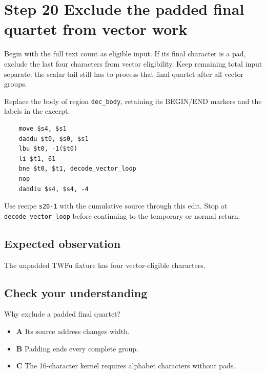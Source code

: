 \section{Step 20 Exclude the padded final quartet from vector work}\label{base64-s20}

Begin with the full text count as eligible input. If its final character is a pad, exclude the last four characters from vector eligibility. Keep remaining total input separate: the scalar tail still has to process that final quartet after all vector groups.

Replace the body of region \texttt{dec\_body}, retaining its BEGIN/END markers and the labels in the excerpt.

\begin{verbatim}
    move $s4, $s1
    daddu $t0, $s0, $s1
    lbu $t0, -1($t0)
    li $t1, 61
    bne $t0, $t1, decode_vector_loop
    nop
    daddiu $s4, $s4, -4
\end{verbatim}

Use recipe \texttt{s20-1} with the cumulative source through this edit. Stop at \texttt{decode\_vector\_loop} before continuing to the temporary or normal return.

\subsection{Expected observation}
The unpadded TWFu fixture has four vector-eligible characters.

\subsection{Check your understanding}
Why exclude a padded final quartet?

\begin{itemize}
  \item \textbf{A} Its source address changes width.
  \item \textbf{B} Padding ends every complete group.
  \item \textbf{C} The 16-character kernel requires alphabet characters without pads.
\end{itemize}
